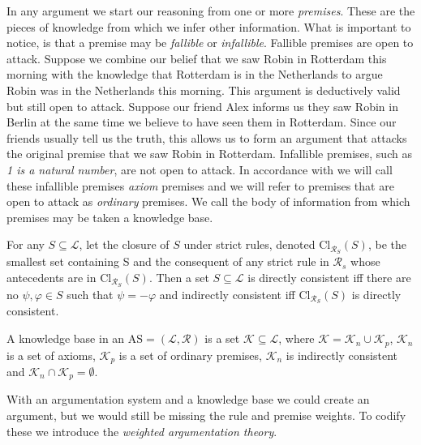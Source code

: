 \documentclass[runningheads]{llncs}
\newcommand{\comment}[1]{\textcolor{red}{#1}}
\newcommand{\R}{\mathcal{R}}
\newcommand{\Rs}{\mathcal{R}_s}
\newcommand{\La}{\mathcal{L}}
\newcommand{\K}{\mathcal{K}}
\newcommand{\Kn}{\mathcal{K}_n}
\newcommand{\Kp}{\mathcal{K}_p}
\begin{document}
In any argument we start our reasoning from one or more \textit{premises}. These are the pieces of knowledge from which we infer other information. What is important to notice, is that a premise may be \textit{fallible} or \textit{infallible}. Fallible premises are open to attack. Suppose we combine our belief that we saw Robin in Rotterdam this morning with the knowledge that Rotterdam is in the Netherlands to argue Robin was in the Netherlands this morning. This argument is deductively valid but still open to attack. Suppose our friend Alex informs us they saw Robin in Berlin at the same time we believe to have seen them in Rotterdam. Since our friends usually tell us the truth, this allows us to form an argument that attacks the original premise that we saw Robin in Rotterdam. Infallible premises, such as \textit{1 is a natural number}, are not open to attack. In accordance with \cite{DBLP:journals/argcom/ModgilP14} we will call these infallible premises \textit{axiom} premises and we will refer to premises that are open to attack as \textit{ordinary} premises. We call the body of information from which premises may be taken a knowledge base.

\begin{definition}[Consistency]\label{Consistency}
For any $S \subseteq \La$, let the closure of $S$ under strict rules, denoted $\text{Cl}_{\mathcal{R}_{S}}(S)$, be the smallest set containing S and the consequent of any strict rule in $\Rs$ whose antecedents are in $\text{Cl}_{\mathcal{R}_{S}}(S)$. Then a set $S \subseteq \La$ is directly consistent iff there are no $\psi, \varphi \in S$ such that $\psi = -\varphi$ and indirectly consistent iff $\text{Cl}_{\mathcal{R}_{S}}(S)$ is directly consistent. \cite{DBLP:conf/kr/Prakken18}
\end{definition}

\begin{definition}\label{KB}
A knowledge base in an $\text{AS} = ( \La,\R )$ is a set $\K \subseteq \La$, where $\K = \Kn \cup \Kp$, $\Kn$ is a set of axioms, $\Kp$ is a set of ordinary premises, $\Kn$ is indirectly consistent and $\Kn \cap \Kp = \emptyset$.%
\end{definition}

With an argumentation system and a knowledge base we could create an argument, but we would still be missing the rule and premise weights. To codify these we introduce the \textit{weighted argumentation theory}.
\end{document}
